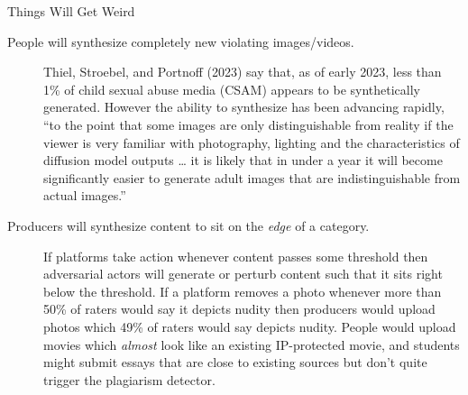 \documentclass[
  10pt,
  ignorenonframetext,
]{beamer}
\begin{document}
\begin{frame}{Things Will Get Weird}
\label{things-will-get-weird}
\begin{description}
\item[People will synthesize completely new violating images/videos.]
Thiel, Stroebel, and Portnoff (2023) say that, as of early 2023, less
than 1\% of child sexual abuse media (CSAM) appears to be synthetically
generated. However the ability to synthesize has been advancing rapidly,
``to the point that some images are only distinguishable from reality if
the viewer is very familiar with photography, lighting and the
characteristics of diffusion model outputs \ldots{} it is likely that in
under a year it will become significantly easier to generate adult
images that are indistinguishable from actual images.''
\item[Producers will synthesize content to sit on the \emph{edge} of a
category.]
If platforms take action whenever content passes some threshold then
adversarial actors will generate or perturb content such that it sits
right below the threshold. If a platform removes a photo whenever more
than 50\% of raters would say it depicts nudity then producers would
upload photos which 49\% of raters would say depicts nudity. People
would upload movies which \emph{almost} look like an existing
IP-protected movie, and students might submit essays that are close to
existing sources but don't quite trigger the plagiarism detector.
\end{description}
\end{frame}
\end{document}
